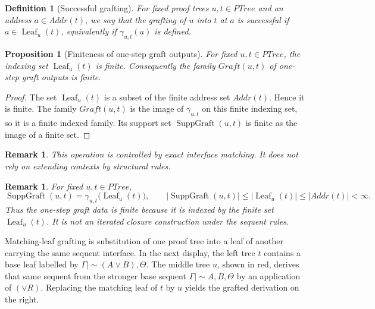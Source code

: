 \documentclass[11pt]{article}
\newtheorem{proposition}[theorem]{Proposition}
\newtheorem{definition}[theorem]{Definition}
\newtheorem{remark}[theorem]{Remark}
\newcommand{\ms}{\mathrel{\mid\!\sim}}
\newcommand{\PTree}{\mathit{PTree}}
\newcommand{\Addr}{\mathit{Addr}}
\newcommand{\Graft}{\mathit{Graft}}
\begin{document}
\begin{definition}[Successful grafting]
For fixed proof trees \(u,t\in \PTree\) and an address \(a\in \Addr(t)\), we
say that the grafting of \(u\) into \(t\) at \(a\) is \emph{successful} if
\(a\in \operatorname{Leaf}_u(t)\), equivalently if \(\gamma_{u,t}(a)\) is
defined.
\end{definition}

\begin{proposition}[Finiteness of one-step graft outputs]
For fixed \(u,t\in \PTree\), the indexing set \(\operatorname{Leaf}_u(t)\) is
finite. Consequently the family \(\Graft(u,t)\) of one-step graft outputs is
finite.
\end{proposition}

\begin{proof}
The set \(\operatorname{Leaf}_u(t)\) is a subset of the finite address set
\(\Addr(t)\). Hence it is finite. The family \(\Graft(u,t)\) is the image of
\(\gamma_{u,t}\) on this finite indexing set, so it is a finite indexed family.
Its support set \(\operatorname{SuppGraft}(u,t)\) is finite as the image of a
finite set.
\end{proof}

\begin{remark}
This operation is controlled by exact interface matching. It does not rely on
extending contexts by structural rules.
\end{remark}

\begin{remark}
For fixed \(u,t\in \PTree\),
\[
\operatorname{SuppGraft}(u,t)=\gamma_{u,t}\bigl(\operatorname{Leaf}_u(t)\bigr),
\qquad
|\operatorname{SuppGraft}(u,t)|\le |\operatorname{Leaf}_u(t)|\le |\Addr(t)|<\infty.
\]
Thus the one-step graft data is finite because it is indexed by the finite set
\(\operatorname{Leaf}_u(t)\). It is not an iterated closure construction under
the sequent rules.
\end{remark}

\noindent Matching-leaf grafting is substitution of one proof tree into a leaf
of another carrying the same sequent interface. In the next display, the left
tree \(t\) contains a base leaf labelled by \(\Gamma \ms (A\vee B),\Theta\).
The middle tree \(u\), shown in red, derives that same sequent from the
stronger base sequent \(\Gamma \ms A,B,\Theta\) by an application of
\((\vee R)\). Replacing the
matching leaf of \(t\) by \(u\) yields the grafted derivation on the right.
\end{document}
